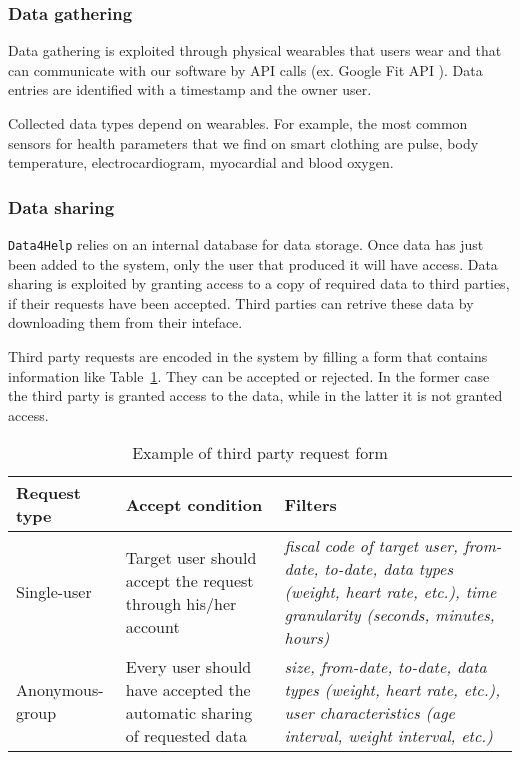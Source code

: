     \subsubsection{Data gathering}
    \label{sec:datagathering}

      Data gathering is exploited through physical wearables that users wear and that can communicate with our software by API calls (ex. Google Fit API \cite{googlefitapi}). Data entries are identified with a timestamp and the owner user.

      Collected data types depend on wearables. For example, the most common sensors for health parameters that we find on smart clothing \cite{sensors} are pulse, body temperature, electrocardiogram, myocardial and blood oxygen.



    \subsubsection{Data sharing}

      \texttt{Data4Help} relies on an internal database for data storage. Once data has just been added to the system, only the user that produced it will have access. Data sharing is exploited by granting access to a copy of required data to third parties, if their requests have been accepted. Third parties can retrive these data by downloading them from their inteface.

      Third party requests are encoded in the system by filling a form that contains information like Table~\ref{tab:tprequest}. They can be accepted or rejected. In the former case the third party is granted access to the data, while in the latter it is not granted access.

      \begin{table}[h!]
        \centering
        \begin{tabularx}{\linewidth}{|l|X|X|}
          \hline
          \textbf{Request type} & \textbf{Accept condition}                                               & \textbf{Filters}                                                                                                                           \\ \hline
          Single-user           & Target user should accept the request through his/her account                                   & \textit{fiscal code of target user, from-date, to-date, data types (weight, heart rate, etc.), time granularity (seconds, minutes, hours)} \\ \hline
          Anonymous-group       & Every user should have accepted the automatic sharing of requested data & \textit{size, from-date, to-date, data types (weight, heart rate, etc.), user characteristics (age interval, weight interval, etc.)}       \\ \hline
        \end{tabularx}
        \caption{Example of third party request form}
        \label{tab:tprequest}
      \end{table}

